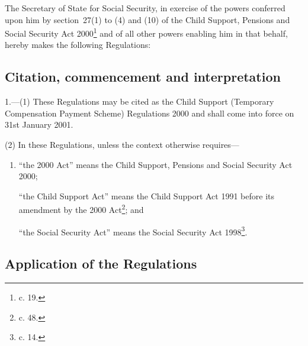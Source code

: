 \documentclass[12pt,a4paper]{article}
\title{\regstitle}
\author{S.I. 2000 No. 3174}
\date{Made 30th November 2000\\Laid before Parliament 6th December 2000\\Coming into force 31st January 2001}
\begin{document}
\maketitle

\noindent
The Secretary of State for Social Security, in exercise of the powers conferred upon him by section~27(1) to (4) and (10) of the Child Support, Pensions and Social Security Act 2000\footnote{ c. 19.} and of all other powers enabling him in that behalf, hereby makes the following Regulations: 

{\sloppy

\tableofcontents

}

\bigskip

\setcounter{secnumdepth}{-2}

\subsection[1. Citation, commencement and interpretation]{Citation, commencement and interpretation}

1.---(1)  These Regulations may be cited as the Child Support (Temporary Compensation Payment Scheme) Regulations 2000 and shall come into force on 31st January 2001.

\pagebreak[3]

(2) In these Regulations, unless the context otherwise requires—
\begin{enumerate}\item[]
“the 2000 Act” means the Child Support, Pensions and Social Security Act 2000;

“the Child Support Act” means the Child Support Act 1991 before its amendment by the 2000 Act\footnote{ c. 48.}; and

“the Social Security Act” means the Social Security Act 1998\footnote{ c. 14.}.
\end{enumerate}

\subsection[2. Application of the Regulations]{Application of the Regulations}
\end{document}
